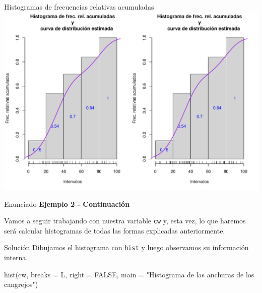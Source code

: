 \documentclass[
  ignorenonframetext,
  aspectratio=169]{beamer}
\newenvironment{Shaded}{\begin{snugshade}}{\end{snugshade}}
\newcommand{\AttributeTok}[1]{\textcolor[rgb]{0.77,0.63,0.00}{#1}}
\newcommand{\ConstantTok}[1]{\textcolor[rgb]{0.00,0.00,0.00}{#1}}
\newcommand{\FunctionTok}[1]{\textcolor[rgb]{0.00,0.00,0.00}{#1}}
\newcommand{\NormalTok}[1]{#1}
\newcommand{\StringTok}[1]{\textcolor[rgb]{0.31,0.60,0.02}{#1}}
\begin{document}
\begin{frame}{Histogramas de frecuencias relativas acumuladas}
\protect\hypertarget{histogramas-de-frecuencias-relativas-acumuladas-2}{}
\includegraphics{Hora6_files/figure-beamer/unnamed-chunk-54-1.pdf}
\end{frame}

\begin{frame}[fragile]{Enunciado}
\protect\hypertarget{enunciado-3}{}
\textbf{Ejemplo 2 - Continuación}

Vamos a seguir trabajando con nuestra variable \texttt{cw} y, esta vez,
lo que haremos será calcular histogramas de todas las formas explicadas
anteriormente.
\end{frame}

\begin{frame}[fragile]{Solución}
\protect\hypertarget{soluciuxf3n-37}{}
Dibujamos el histograma con \texttt{hist} y luego observamos su
información interna.

\begin{Shaded}
\begin{Highlighting}[]
\FunctionTok{hist}\NormalTok{(cw, }\AttributeTok{breaks =}\NormalTok{ L, }\AttributeTok{right =} \ConstantTok{FALSE}\NormalTok{, }\AttributeTok{main =} \StringTok{"Histograma de las }
\StringTok{     anchuras de los cangrejos"}\NormalTok{)}
\end{Highlighting}
\end{Shaded}
\end{frame}
\end{document}
